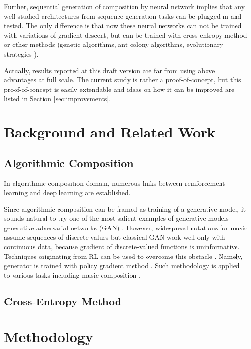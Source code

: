 \documentclass{article}
\begin{document}
Further, sequential generation of composition by neural network implies that any well-studied architectures from sequence generation tasks can be plugged in and tested. The only difference is that now these neural networks can not be trained with variations of gradient descent, but can be trained with cross-entropy method or other methods (genetic algorithms, ant colony algorithms, evolutionary strategies \cite{salimans2017evolution}).

Actually, results reported at this draft version are far from using above advantages at full scale. The current study is rather a proof-of-concept, but this proof-of-concept is easily extendable and ideas on how it can be improved are listed in Section \ref{sec:improvements}.


\section{Background and Related Work}
\label{sec:literature}

\subsection{Algorithmic Composition}
\label{subsec:composition}

In algorithmic composition domain, numerous links between reinforcement learning and deep learning are established.


Since algorithmic composition can be framed as training of a generative model, it sounds natural to try one of the most salient examples of generative models -- generative adversarial networks (GAN) \cite{goodfellow2014gan}. However, widespread notations for music assume sequences of discrete values but classical GAN work well only with continuous data, because gradient of discrete-valued functions is uninformative. Techniques originating from RL can be used to overcome this obstacle \cite{yu2016seqgan,hjelm2017boundary}. Namely, generator is trained with policy gradient method \cite{williams1992simple}. Such methodology is applied to various tasks including music composition \cite{limaguimaraes2017objective}. 

\subsection{Cross-Entropy Method}
\label{subsec:crossentropy}


\section{Methodology}
\label{sec:methodology}
\end{document}
